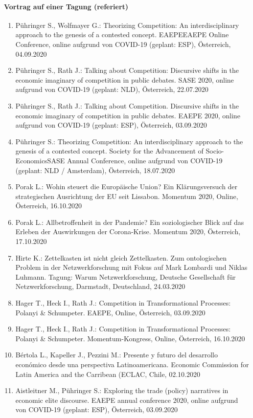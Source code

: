 \paragraph{Vortrag auf einer Tagung (referiert)}
\begin{enumerate}
	\item Pühringer S., Wolfmayer G.: Theorizing Competition: An interdisciplinary approach to the genesis of a contested concept. EAEPEEAEPE Online Conference, online aufgrund von COVID-19 (geplant: ESP), Österreich, 04.09.2020
	\item Pühringer S., Rath J.: Talking about Competition: Discursive shifts in the economic imaginary of competition in public debates. SASE 2020, online aufgrund von COVID-19 (geplant: NLD), Österreich, 22.07.2020
	\item Pühringer S., Rath J.: Talking about Competition. Discursive shifts in the economic imaginary of competition in public debates. EAEPE 2020, online aufgrund von COVID-19 (geplant: ESP), Österreich, 03.09.2020
	\item Pühringer S.: Theorizing Competition: An interdisciplinary approach to the genesis of a contested concept. Society for the Advancement of Socio-EconomicsSASE Annual Conference, online aufgrund von COVID-19 (geplant: NLD / Amsterdam), Österreich, 18.07.2020
	\item Porak L.: Wohin steuert die Europäische Union? Ein Klärungsversuch der strategischen Ausrichtung der EU seit Lissabon. Momentum 2020, Online, Österreich, 16.10.2020
	\item Porak L.: Allbetroffenheit in der Pandemie? Ein soziologischer Blick auf das Erleben der Auswirkungen der Corona-Krise. Momentum 2020, Österreich, 17.10.2020
	\item Hirte K.: Zettelkasten ist nicht gleich Zettelkasten. Zum ontologischen Problem in der Netzwerkforschung mit Fokus auf Mark Lombardi und Niklas Luhmann. Tagung: Warum Netzwerkforschung, Deutsche Gesellschaft für Netzwerkforschung, Darmstadt, Deutschland, 24.03.2020
	\item Hager T., Heck I., Rath J.: Competition in Transformational Processes: Polanyi & Schumpeter. EAEPE, Online, Österreich, 03.09.2020
	\item Hager T., Heck I., Rath J.: Competition in Transformational Processes: Polanyi & Schumpeter. Momentum-Kongress, Online, Österreich, 16.10.2020
	\item Bértola L., Kapeller J., Pezzini M.: Presente y futuro del desarrollo económico desde una perspectiva Latinoamericana. Economic Commission for Latin America and the Carribean (ECLAC, Chile, 02.10.2020
	\item Aistleitner M., Pühringer S.: Exploring the trade (policy) narratives in economic elite discourse. EAEPE annual conference 2020, online aufgrund von COVID-19 (geplant: ESP), Österreich, 03.09.2020
\end{enumerate}
